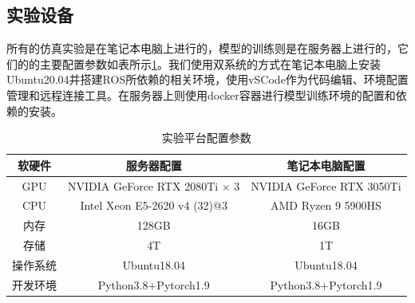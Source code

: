 \subsection{实验设备}
所有的仿真实验是在笔记本电脑上进行的，模型的训练则是在服务器上进行的，它们的的主要配置参数如表所示\ref{platformconfig}。我们使用双系统的方式在笔记本电脑上安装Ubuntu20.04并搭建ROS所依赖的相关环境，使用vSCode作为代码编辑、环境配置管理和远程连接工具。在服务器上则使用docker容器进行模型训练环境的配置和依赖的安装。
\begin{table}
    \caption{\label{platformconfig}实验平台配置参数}
    \centering
    \small
    \begin{tabular}{ccc}
        \hline
        软硬件 & 服务器配置 & 笔记本电脑配置 \tabularnewline 
        \hline 
        GPU & NVIDIA GeForce RTX 2080Ti × 3 & NVIDIA GeForce RTX 3050Ti \tabularnewline
        CPU & Intel Xeon E5-2620 v4 (32)@3 & AMD Ryzen 9 5900HS \tabularnewline
        内存 & 128GB & 16GB \tabularnewline
        存储 & 4T & 1T \tabularnewline
        操作系统 & Ubuntu18.04 & Ubuntu18.04 \tabularnewline
        开发环境 & Python3.8+Pytorch1.9 & Python3.8+Pytorch1.9 \tabularnewline
        \hline 
    \end{tabular}
\end{table}

